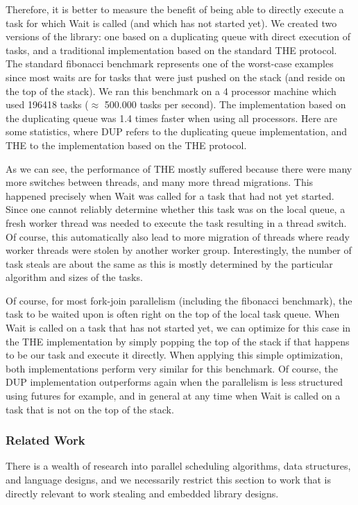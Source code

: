 Therefore, it is better to measure the benefit of being able to
directly execute a task for which Wait is called (and which has not
started yet). We created two versions of the library: one based on a
duplicating queue with direct execution of tasks, and a traditional
implementation based on the standard THE protocol. The standard
fibonacci benchmark represents one of the worst-case examples since
most waits are for tasks that were just pushed on the stack (and
reside on the top of the stack). We ran this benchmark on a 4
processor machine which used 196418 tasks ($\approx$ 500.000 tasks per
second). The implementation based on the duplicating queue was 1.4
times faster when using all processors. Here are some statistics,
where DUP refers to the duplicating queue implementation, and THE to
the implementation based on the THE protocol.

As we can see, the performance of THE mostly suffered because there
were many more switches between threads, and many more thread
migrations. This happened precisely when Wait was called for a task
that had not yet started. Since one cannot reliably determine whether
this task was on the local queue, a fresh worker thread was needed to
execute the task resulting in a thread switch. Of course, this
automatically also lead to more migration of threads where ready
worker threads were stolen by another worker group. Interestingly,
the number of task steals are about the same as this is mostly
determined by the particular algorithm and sizes of the tasks.

Of course, for most fork-join parallelism (including the fibonacci
benchmark), the task to be waited upon is often right on the top of
the local task queue. When Wait is called on a task that has not
started yet, we can optimize for this case in the THE implementation
by simply popping the top of the stack if that happens to be our task
and execute it directly. When applying this simple optimization, both
implementations perform very similar for this benchmark. Of course,
the DUP implementation outperforms again when the parallelism is less
structured using futures for example, and in general at any time when
Wait is called on a task that is not on the top of the stack.

\subsubsection{Related Work}

There is a wealth of research into parallel scheduling algorithms,
data structures, and language designs, and we necessarily restrict
this section to work that is directly relevant to work stealing and
embedded library designs.

